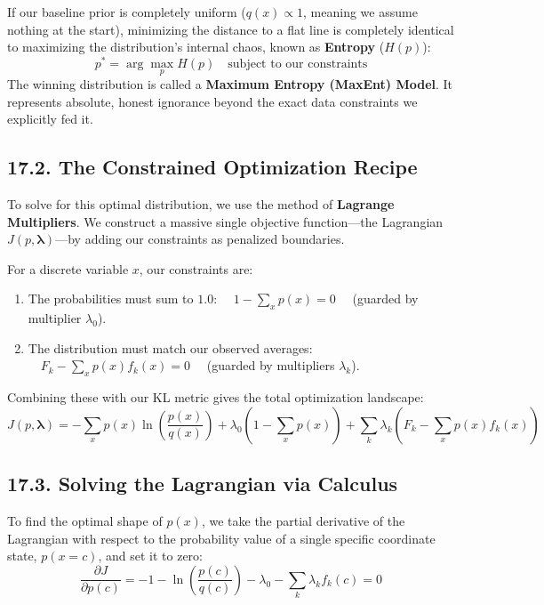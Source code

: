 \documentclass{article}
\begin{document}
If our baseline prior is completely uniform ($q(x) \propto 1$, meaning we assume nothing at the start), minimizing the distance to a flat line is completely identical to maximizing the distribution's internal chaos, known as \textbf{Entropy} ($H(p)$):
\begin{equation}
p^* = \arg\max_p H(p) \quad \text{subject to our constraints} \tag{90}
\end{equation}
The winning distribution is called a \textbf{Maximum Entropy (MaxEnt) Model}. It represents absolute, honest ignorance beyond the exact data constraints we explicitly fed it.

\subsection*{17.2. The Constrained Optimization Recipe}
To solve for this optimal distribution, we use the method of \textbf{Lagrange Multipliers}. We construct a massive single objective function—the Lagrangian $J(p, \boldsymbol{\lambda})$—by adding our constraints as penalized boundaries. 

For a discrete variable $x$, our constraints are:
\begin{enumerate}
    \item The probabilities must sum to $1.0$: $\quad 1 - \sum_x p(x) = 0 \quad$ (guarded by multiplier $\lambda_0$).
    \item The distribution must match our observed averages: $\quad F_k - \sum_x p(x)f_k(x) = 0 \quad$ (guarded by multipliers $\lambda_k$).
\end{enumerate}

Combining these with our KL metric gives the total optimization landscape:
\begin{equation}
J(p, \boldsymbol{\lambda}) = -\sum_x p(x) \ln\left(\frac{p(x)}{q(x)}\right) + \lambda_0 \left( 1 - \sum_x p(x) \right) + \sum_k \lambda_k \left( F_k - \sum_x p(x)f_k(x) \right) \tag{91}
\end{equation}

\subsection*{17.3. Solving the Lagrangian via Calculus}
To find the optimal shape of $p(x)$, we take the partial derivative of the Lagrangian with respect to the probability value of a single specific coordinate state, $p(x = c)$, and set it to zero:
\begin{equation}
\frac{\partial J}{\partial p(c)} = -1 - \ln\left(\frac{p(c)}{q(c)}\right) - \lambda_0 - \sum_k \lambda_k f_k(c) = 0 \tag{92}
\end{equation}
\end{document}
